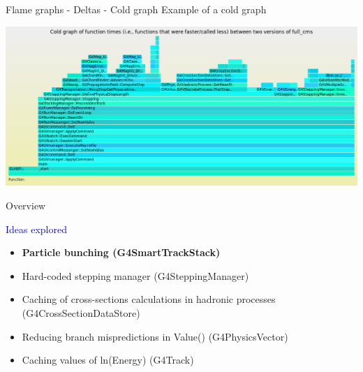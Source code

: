 \documentclass{beamer}
\begin{document}
\begin{frame}{Flame graphs - Deltas - Cold graph}
Example of a cold graph

\begin{center}
  \includegraphics[width=1.0\textwidth]{dec.png}
\end{center}
\end{frame}

\begin{frame}
\begin{center}
\end{center}
\end{frame}

\begin{frame}{Overview}

\textcolor{blue}{Ideas explored}
\begin{itemize}
  \item {\bf Particle bunching (G4SmartTrackStack) }
  \item Hard-coded stepping manager (G4SteppingManager)
  \item Caching of cross-sections calculations in hadronic processes (G4CrossSectionDataStore)
  \item Reducing branch mispredictions in Value() (G4PhysicsVector)
  \item Caching values of ln(Energy) (G4Track)
\end{itemize}
\end{frame}
\end{document}
